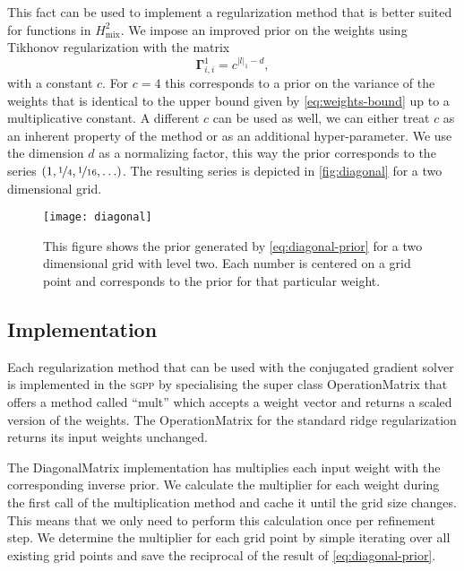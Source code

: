 This fact can be used to implement a regularization method that is better suited for functions in \(H^2_\text{mix}\).
We impose an improved prior on the weights using Tikhonov regularization
with the matrix
\begin{equation}\label{eq:diagonal-prior}
\bm{\Gamma}_{i,i}^{1} = c^{\vert l \vert_1 - d},
\end{equation}
with a constant \(c\).
For \(c = 4\) this corresponds to a prior on the variance of the weights that is identical to the upper bound given by \cref{eq:weights-bound} up to a multiplicative constant.
A different \(c\) can be used as well, we can either treat \(c\) as an inherent property of the method or as an additional hyper-parameter.
We use the dimension \(d\) as a normalizing factor, this way the prior
corresponds to the series \((1, \nicefrac{1}{4}, \nicefrac{1}{16}, \ldots)\).
The resulting series is depicted in \vref{fig:diagonal} for a two dimensional grid.

\begin{figure}[htb]
  \centering
  \begin{minipage}[c]{0.6\textwidth}
    \centering
    \texttt{[image: diagonal]}
  \end{minipage}\hfill
  \begin{minipage}[c]{0.4\textwidth}
\caption[Diagonal Regularization]{
This figure shows the prior generated by \cref{eq:diagonal-prior} for a two
dimensional grid with level two. Each number is centered on a grid point and
corresponds to the prior for that particular weight.
}\label{fig:diagonal}
  \end{minipage}
\end{figure}

\FloatBarrier{}

\subsection{Implementation}
Each regularization method that can be used with the conjugated gradient solver
is implemented in the \textsc{sgpp} by specialising the super class
OperationMatrix that offers a method called ``mult'' which accepts a weight
vector and returns a scaled version of the weights.
The OperationMatrix for the standard ridge regularization returns its input
weights unchanged.

The DiagonalMatrix implementation has multiplies each input weight with the
corresponding inverse prior.
We calculate the multiplier for each weight during the first call of the
multiplication method and cache it until the grid size changes.
This means that we only need to perform this calculation once per refinement
step.
We determine the multiplier for each grid point by simple iterating over all
existing grid points and save the reciprocal of the result of \cref{eq:diagonal-prior}.


